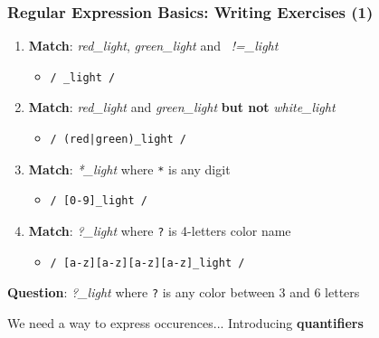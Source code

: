 \documentclass{beamer}
\begin{document}
\begin{frame}[fragile]
    \frametitle{Regular Expression Basics: Writing Exercises (1)}
    \begin{enumerate}
        \item \textbf{Match}: \textit{red\_light}, \textit{green\_light} and \textit{~!=\_light}
        \pause
        \begin{itemize}
            \item[] \begin{verbatim}/ _light /\end{verbatim}
        \end{itemize}
        \item \textbf{Match}: \textit{red\_light} and \textit{green\_light} \textbf{but not} \textit{white\_light}
        \pause
        \begin{itemize}
            \item[] \begin{verbatim}/ (red|green)_light /\end{verbatim}
        \end{itemize}
        \item \textbf{Match}: \textit{*\_light} where \texttt{*} is any digit
        \pause
        \begin{itemize}
            \item[] \begin{verbatim}/ [0-9]_light /\end{verbatim}
        \end{itemize}
        \item \textbf{Match}: \textit{?\_light} where \texttt{?} is 4-letters color name
        \pause
        \begin{itemize}
            \item[] \begin{verbatim}/ [a-z][a-z][a-z][a-z]_light /\end{verbatim}
        \end{itemize}
        \pause
    \end{enumerate}
    \vspace*{1em}
    \textbf{Question}: \textit{?\_light} where \texttt{?} is any color between 3 and 6 letters
    \begin{center}
        We need a way to express occurences... Introducing \textbf{quantifiers}
    \end{center}
\end{frame}
\end{document}

